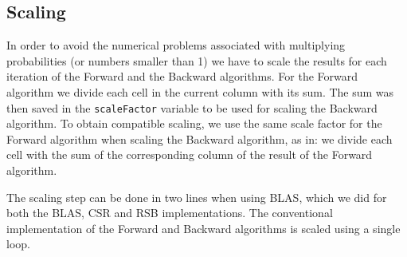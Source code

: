 \subsection{Scaling}
In order to avoid the numerical problems associated with multiplying probabilities (or numbers smaller than 1) we have to scale the results for each iteration of the Forward and the Backward algorithms. For the Forward algorithm we divide each cell in the current column with its sum. The sum was then saved in the \texttt{scaleFactor} variable to be used for scaling the Backward algorithm. To obtain compatible scaling, we use the same scale factor for the Forward algorithm when scaling the Backward algorithm, as in: we divide each cell with the sum of the corresponding column of the result of the Forward algorithm. 

The scaling step can be done in two lines when using BLAS, which we did for both the BLAS, CSR and RSB implementations. The conventional implementation of the Forward and Backward algorithms is scaled using a single loop.
